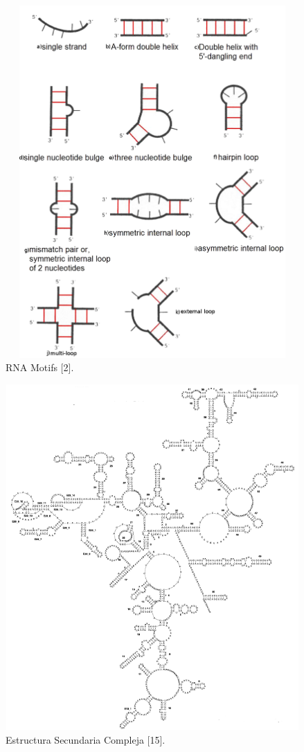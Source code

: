 \vskip 10cm
\begin{figure} [!h]
	\begin{center}
		\vskip 2cm
		\includegraphics[width=5.5209in,height=5.3000in]{image/motifs2.png}
		\caption{RNA Motifs [2].}
		\label{motifs}
	\end{center}
\end{figure}

\begin{figure} [h]	
		\includegraphics[width=5.8209in,height=5.2000in]{image/compleja.png}
		\caption{Estructura Secundaria Compleja [15].}		
		\label{compleja}	
\end{figure}	


